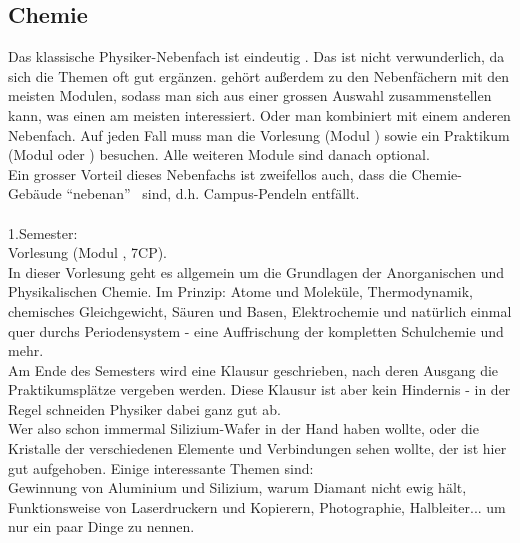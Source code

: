 \subsection{Chemie}
\label{subsec:chemie}
Das klassische Physiker-Nebenfach ist eindeutig . Das ist nicht verwunderlich, da sich die Themen oft gut erg\"anzen.  geh\"ort au\ss erdem zu den Nebenf\"achern mit den meisten Modulen, sodass man sich aus einer grossen Auswahl zusammenstellen kann, was einen am meisten interessiert. Oder man kombiniert mit einem anderen Nebenfach. Auf jeden Fall muss man die Vorlesung  (Modul ) sowie ein Praktikum (Modul  oder ) besuchen. Alle weiteren Module sind danach optional.\\
Ein grosser Vorteil dieses Nebenfachs ist zweifellos auch, dass die Chemie-Geb\"aude \enquote{nebenan} ~sind, d.h. Campus-Pendeln entf\"allt.\\\\
1.Semester:\\
Vorlesung  (Modul , 7CP).\\
In dieser Vorlesung geht es allgemein um die Grundlagen der Anorganischen und Physikalischen Chemie. Im Prinzip: Atome und Molek\"ule, Thermodynamik, chemisches Gleichgewicht, S\"auren und Basen, Elektrochemie und nat\"urlich einmal quer durchs Periodensystem - eine Auffrischung der kompletten Schulchemie und mehr.\\
Am Ende des Semesters wird eine Klausur geschrieben, nach deren Ausgang die Praktikumspl\"atze vergeben werden. Diese Klausur ist aber kein Hindernis - in der Regel schneiden Physiker dabei ganz gut ab.\\
Wer also schon immermal Silizium-Wafer in der Hand haben wollte, oder die Kristalle der verschiedenen Elemente und Verbindungen sehen wollte, der ist hier gut aufgehoben. Einige interessante Themen sind:\\
Gewinnung von Aluminium und Silizium, warum Diamant nicht ewig h\"alt, Funktionsweise von Laserdruckern und Kopierern, Photographie, Halbleiter... um nur ein paar Dinge zu nennen.\\\\
